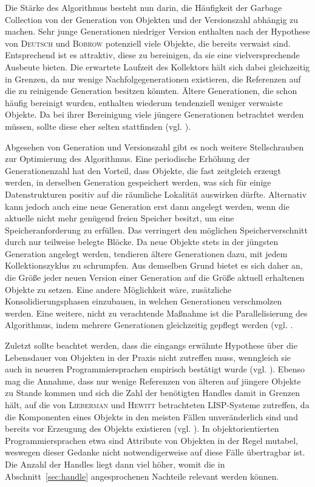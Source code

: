 \newpage

Die Stärke des Algorithmus besteht nun darin, die Häufigkeit der Garbage Collection von der Generation von Objekten und der Versionszahl abhängig zu machen.
Sehr junge Generationen niedriger Version enthalten nach der Hypothese von \textsc{Deutsch} und \textsc{Bobrow} potenziell viele Objekte, die bereits verwaist sind.
Entsprechend ist es attraktiv, diese zu bereinigen, da sie eine vielversprechende Ausbeute bieten.
Die erwartete Laufzeit des Kollektors hält sich dabei gleichzeitig in Grenzen, da nur wenige Nachfolgegenerationen existieren, die Referenzen auf die zu reinigende Generation besitzen könnten.
Ältere Generationen, die schon häufig bereinigt wurden, enthalten wiederum tendenziell weniger verwaiste Objekte.
Da bei ihrer Bereinigung viele jüngere Generationen betrachtet werden müssen, sollte diese eher selten stattfinden (vgl. \cite[S. 423]{lieberman1983}).

Abgesehen von Generation und Versionszahl gibt es noch weitere Stellschrauben zur Optimierung des Algorithmus.
Eine periodische Erhöhung der Generationenzahl hat den Vorteil, dass Objekte, die fast zeitgleich erzeugt werden, in derselben Generation gespeichert werden, was sich für einige Datenstrukturen positiv auf die räumliche Lokalität auswirken dürfte.
Alternativ kann jedoch auch eine neue Generation erst dann angelegt werden, wenn die aktuelle nicht mehr genügend freien Speicher besitzt, um eine Speicheranforderung zu erfüllen.
Das verringert den möglichen Speicherverschnitt durch nur teilweise belegte Blöcke.
Da neue Objekte stets in der jüngsten Generation angelegt werden, tendieren ältere Generationen dazu, mit jedem Kollektionszyklus zu schrumpfen.
Aus demselben Grund bietet es sich daher an, die Größe jeder neuen Version einer Generation auf die Größe aktuell erhaltenen Objekte zu setzen.
Eine andere Möglichkeit wäre, zusätzliche Konsolidierungsphasen einzubauen, in welchen Generationen verschmolzen werden.
Eine weitere, nicht zu verachtende Maßnahme ist die Parallelisierung des Algorithmus, indem mehrere Generationen gleichzeitig gepflegt werden (vgl. \cite[S. 426]{lieberman1983}.

Zuletzt sollte beachtet werden, dass die eingangs erwähnte Hypothese über die Lebensdauer von Objekten in der Praxis nicht zutreffen muss, wenngleich sie auch in neueren Programmiersprachen empirisch bestätigt wurde (vgl. \cite{jones2008}).
Ebenso mag die Annahme, dass nur wenige Referenzen von älteren auf jüngere Objekte zu Stande kommen und sich die Zahl der benötigten Handles damit in Grenzen hält, auf die von \textsc{Lieberman} und \textsc{Hewitt} betrachteten LISP-Systeme zutreffen, da die Komponenten eines Objekts in den meisten Fällen unveränderlich sind und bereits vor Erzeugung des Objekts existieren (vgl. \cite[S. 422]{lieberman1983}).
In objektorientierten Programmiersprachen etwa sind Attribute von Objekten in der Regel mutabel, weswegen dieser Gedanke nicht notwendigerweise auf diese Fälle übertragbar ist.
Die Anzahl der Handles liegt dann viel höher, womit die in Abschnitt~\ref{sec:handle} angesprochenen Nachteile relevant werden können.



